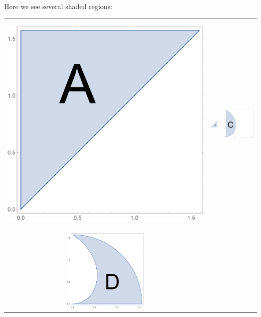 \documentclass{ximera}
\begin{document}
\begin{exercise}
  Here we see several shaded regions:
  \begin{center}
    \begin{tabular}{ccc}
      \begin{image}[1in]
        \includegraphics{region2.png}
      \end{image}
      &
      \includegraphics[width=1cm]{region1.png} &
      \includegraphics[width=4cm]{region6.png} 
      \\
      \includegraphics[width=4cm]{region5.png} &

\end{tabular}
\end{center}
\end{exercise}
\end{document}
